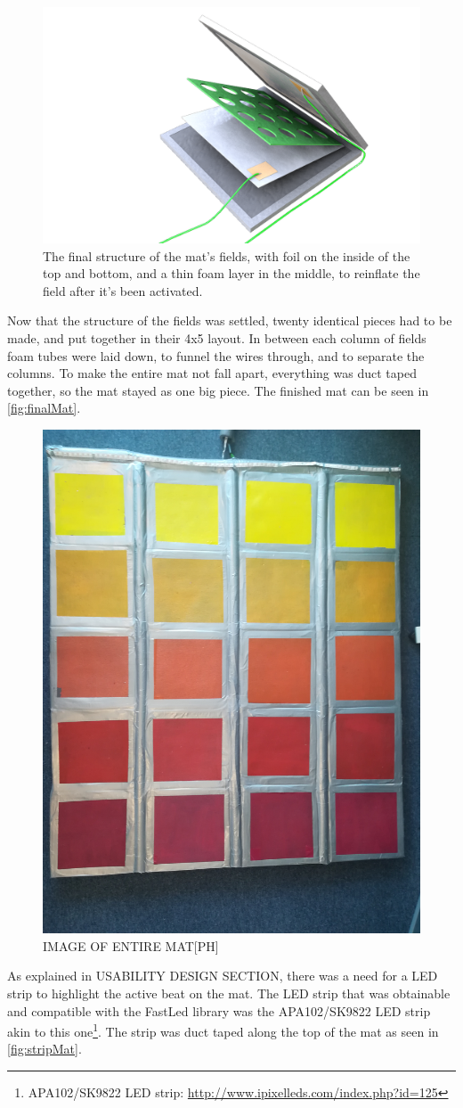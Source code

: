 	\begin{figure}[H]
		\centering
		\includegraphics[width=1\linewidth]{figure/Implementation/Medialogyp4mat}
		\caption{The final structure of the mat's fields, with foil on the inside of the top and bottom, and a thin foam layer in the middle, to reinflate the field after it's been activated.}
		\label{fig:finalField}
	\end{figure}

	Now that the structure of the fields was settled, twenty identical pieces had to be made, and put together in their 4x5 layout. In between each column of fields foam tubes were laid down, to funnel the wires through, and to separate the columns. To make the entire mat not fall apart, everything was duct taped together, so the mat stayed as one big piece. The finished mat can be seen in \autoref{fig:finalMat}.
	\begin{figure}[H]
		\centering
		\includegraphics[width=0.42\linewidth]{figure/Implementation/fullMat}
		\caption{IMAGE OF ENTIRE MAT[PH]}
		\label{fig:finalMat}
	\end{figure}
 	As explained in USABILITY DESIGN SECTION, there was a need for a LED strip to highlight the active beat on the mat. The LED strip that was obtainable and compatible with the FastLed library was the APA102/SK9822 LED strip akin to this one\footnote{APA102/SK9822 LED strip: \url{http://www.ipixelleds.com/index.php?id=125}}. The strip was duct taped along the top of the mat as seen in \autoref{fig:stripMat}.
 	

